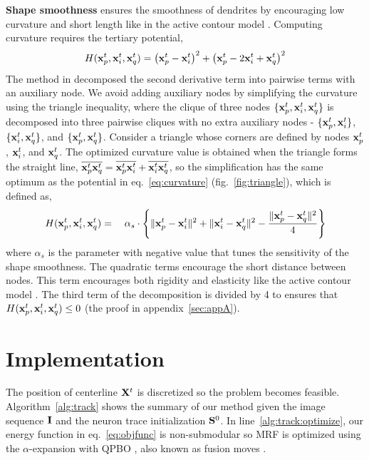 \documentclass{article}
\begin{document}
{\bf Shape smoothness} ensures the smoothness of dendrites by encouraging low curvature and short length like in the active contour model \cite{Kass1988}. Computing curvature requires the tertiary potential,
\begin{equation} \label{eq:curvature}
H({\bf x}_p^t,{\bf x}_i^t,{\bf x}_q^t) = \left( {\bf x}_p^t - {\bf x}_i^t \right)^2 + \left( {\bf x}_p^t - 2{\bf x}_i^t + {\bf x}_q^t \right)^2
\end{equation}
The method in \cite{Woodford2009} decomposed the second derivative term into pairwise terms with an auxiliary node. We avoid adding auxiliary nodes by simplifying the curvature using the triangle inequality, where the clique of three nodes $\{ {\bf x}_p^t,{\bf x}_i^t,{\bf x}_q^t \}$ is decomposed into three pairwise cliques with no extra auxiliary nodes - $\{ {\bf x}_p^t,{\bf x}_i^t \}$, $\{ {\bf x}_i^t,{\bf x}_q^t \}$, and $\{ {\bf x}_p^t,{\bf x}_q^t \}$. Consider a triangle whose corners are defined by nodes ${\bf x}_p^t$, ${\bf x}_i^t$, and ${\bf x}_q^t$. The optimized curvature value is obtained when the triangle forms the straight line, $\overline{{\bf x}_p^t {\bf x}_q^t} = \overline{{\bf x}_p^t {\bf x}_i^t} + \overline{{\bf x}_i^t {\bf x}_q^t}$, so the simplification has the same optimum as the potential in eq.~\ref{eq:curvature} (fig.~\ref{fig:triangle}), which is defined as,
\begin{equation} \label{eq:H}
H({\bf x}_p^t,{\bf x}_i^t,{\bf x}_q^t) = \quad \alpha_s \cdot \left\{ \| {\bf x}_p^t - {\bf x}_i^t \|^2 + \| {\bf x}_i^t - {\bf x}_q^t \|^2 - \frac{ \| {\bf x}_p^t - {\bf x}_q^t \|^2 }{4} \right\}
\end{equation}
where $\alpha_s$ is the parameter with negative value that tunes the sensitivity of the shape smoothness. The quadratic terms encourage the short distance between nodes. This term encourages both rigidity and elasticity like the active contour model \cite{Kass1988}. The third term of the decomposition is divided by 4 to ensures that $H({\bf x}_p^t,{\bf x}_i^t,{\bf x}_q^t) \leq 0$ (the proof in appendix~\ref{sec:appA}).

\section{Implementation}
The position of centerline ${\bf X}^t$ is discretized so the problem becomes feasible. Algorithm~\ref{alg:track} shows the summary of our method given the image sequence ${\bf I}$ and the neuron trace initialization ${\bf S}^0$. In line~\ref{alg:track:optimize}, our energy function in eq.~\ref{eq:objfunc} is non-submodular so MRF is optimized using the $\alpha$-expansion \cite{Boykov2001} with QPBO \cite{Boros2002, Kolmogorov2007}, also known as fusion moves \cite{Lempitsky2010}. 
\end{document}
